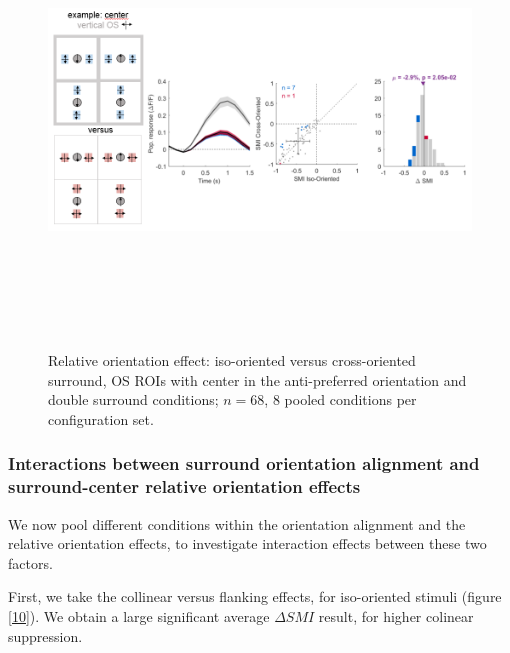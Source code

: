 \begin{figure}[H] \centering \includegraphics[width=12cm,height=12cm,keepaspectratio]{Figures/7.Results/finalPopulation/sel/diagrams/9.png} 
\caption{Relative orientation effect: iso-oriented versus cross-oriented surround, OS ROIs with center in the anti-preferred orientation and double surround conditions;  $n=68$, 8 pooled conditions per configuration set.} \label{9} 
\end{figure}

\subsubsection{Interactions between surround orientation alignment and surround-center relative orientation effects}

We now pool different conditions within the orientation alignment and the relative orientation effects, to investigate interaction effects between these two factors.

First, we take the collinear versus flanking effects, for iso-oriented stimuli (figure \ref{10}). We obtain a large significant average $\Delta SMI$ result, for higher colinear suppression.

